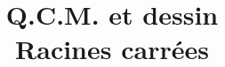 \documentclass[a4paper,11pt]{article}
\title{{\huge Q.C.M. et dessin}\\ Racines carrées}
\author{}
\date{}
\begin{document}
\newcommand{\modeCorrection}{}

\end{document}
